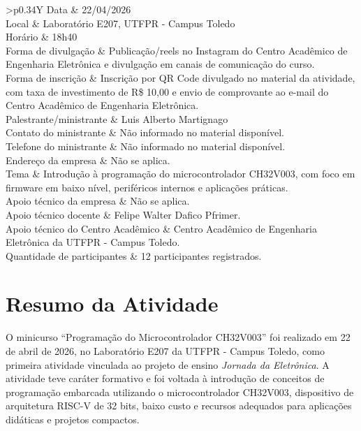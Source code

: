 \documentclass[12pt,a4paper]{article}
\newcommand{\infobox}[1]{%
    \vspace{0.2cm}
    \noindent
    \colorbox{softgray}{%
        \begin{minipage}{0.96\textwidth}
            \vspace{0.35cm}
            #1
            \vspace{0.35cm}
        \end{minipage}
    }
}
\begin{document}
\infobox{
\begin{tabularx}{\textwidth}{>{\bfseries}p{0.34\textwidth}Y}
Data & 22/04/2026 \\
Local & Laboratório E207, UTFPR - Campus Toledo \\
Horário & 18h40 \\
Forma de divulgação & Publicação/reels no Instagram do Centro Acadêmico de Engenharia Eletrônica e divulgação em canais de comunicação do curso. \\
Forma de inscrição & Inscrição por QR Code divulgado no material da atividade, com taxa de investimento de R\$ 10,00 e envio de comprovante ao e-mail do Centro Acadêmico de Engenharia Eletrônica. \\
Palestrante/ministrante & Luis Alberto Martignago \\
Contato do ministrante & Não informado no material disponível. \\
Telefone do ministrante & Não informado no material disponível. \\
Endereço da empresa & Não se aplica. \\
Tema & Introdução à programação do microcontrolador CH32V003, com foco em firmware em baixo nível, periféricos internos e aplicações práticas. \\
Apoio técnico da empresa & Não se aplica. \\
Apoio técnico docente & Felipe Walter Dafico Pfrimer. \\
Apoio técnico do Centro Acadêmico & Centro Acadêmico de Engenharia Eletrônica da UTFPR - Campus Toledo. \\
Quantidade de participantes & 12 participantes registrados. \\
\end{tabularx}
}

\section{Resumo da Atividade}

O minicurso ``Programação do Microcontrolador CH32V003'' foi realizado em 22 de abril de 2026, no Laboratório E207 da UTFPR - Campus Toledo, como primeira atividade vinculada ao projeto de ensino \textit{Jornada da Eletrônica}. A atividade teve caráter formativo e foi voltada à introdução de conceitos de programação embarcada utilizando o microcontrolador CH32V003, dispositivo de arquitetura RISC-V de 32 bits, baixo custo e recursos adequados para aplicações didáticas e projetos compactos.
\end{document}
